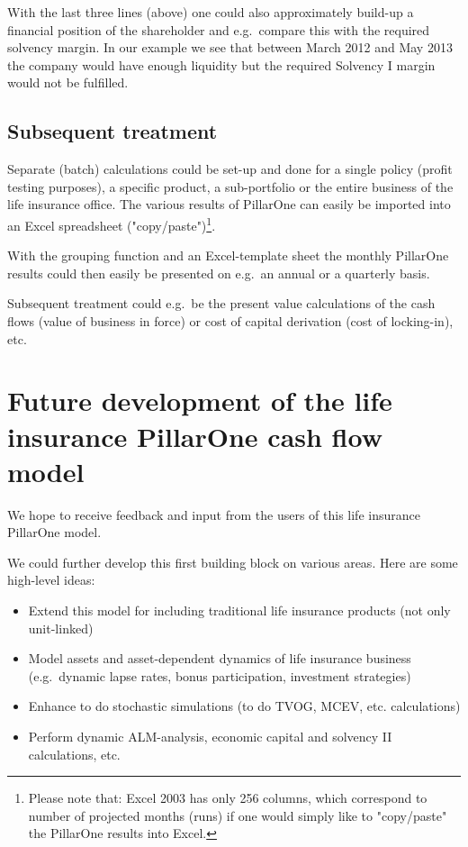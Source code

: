 With the last three lines (above) one could also approximately build-up a financial position of the shareholder and e.g.~compare this with the required solvency margin. In our example we see that between March 2012 and May 2013 the company would have enough liquidity but the required Solvency I margin would not be fulfilled.

\subsection{Subsequent treatment}
Separate (batch) calculations could be set-up and done for a single policy (profit testing purposes), a specific product, a sub-portfolio or the entire business of the life insurance office. The various results of PillarOne can easily be imported into an Excel spreadsheet ("copy/paste")\footnote{Please note that: Excel 2003 has only 256 columns, which correspond to number of projected months (runs) if one would simply like to "copy/paste" the PillarOne results into Excel.}.{}

With the grouping function and an Excel-template sheet the monthly PillarOne results could then easily be presented on e.g.~an annual or a quarterly basis.

Subsequent treatment could e.g.~be the present value calculations of the cash flows (value of business in force) or cost of capital derivation (cost of locking-in), etc.

\section[Future development]{Future development of the life insurance PillarOne cash flow model}\label{sec:lifeoutlook}
We hope to receive feedback and input from the users of this life insurance PillarOne model.

We could further develop this first building block on various areas. Here are some high-level ideas:
\begin{itemize}
	\item Extend this model for including traditional life insurance products (not only unit-linked)
	\item Model assets and asset-dependent dynamics of life insurance business (e.g.~dynamic lapse rates, bonus participation, investment strategies)
	\item Enhance to do stochastic simulations (to do TVOG, MCEV, etc. calculations)
	\item Perform dynamic ALM-analysis, economic capital and solvency II calculations, etc.
\end{itemize}

